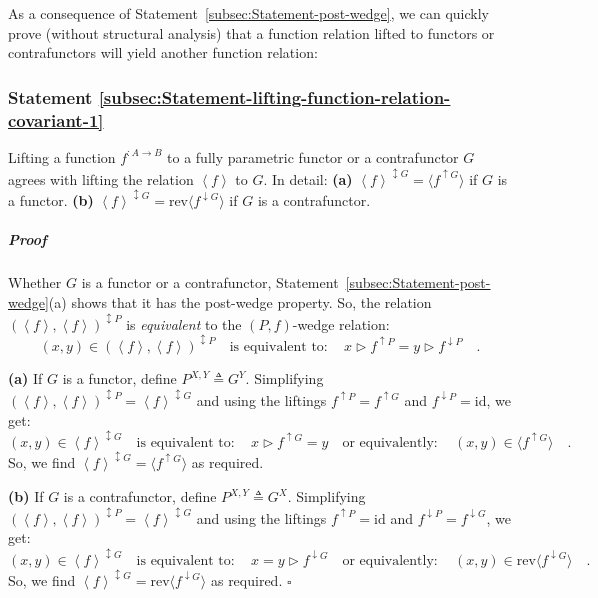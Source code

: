 As a consequence of Statement~\ref{subsec:Statement-post-wedge},
we can quickly prove (without structural analysis) that a function
relation lifted to functors or contrafunctors will yield another function
relation:

\subsubsection{Statement \label{subsec:Statement-lifting-function-relation-covariant-1}\ref{subsec:Statement-lifting-function-relation-covariant-1}}

Lifting a function $f^{:A\rightarrow B}$ to a fully parametric functor
or a contrafunctor $G$ agrees with lifting the relation $\left<f\right>$
to $G$. In detail: \textbf{(a)} $\left<f\right>^{\updownarrow G}=\langle f^{\uparrow G}\rangle$
if $G$ is a functor. \textbf{(b)} $\left<f\right>^{\updownarrow G}=\text{rev}\langle f^{\downarrow G}\rangle$
if $G$ is a contrafunctor.

\subparagraph{Proof}

Whether $G$ is a functor or a contrafunctor, Statement~\ref{subsec:Statement-post-wedge}(a)
shows that it has the post-wedge property. So, the relation $(\left<f\right>,\left<f\right>)^{\updownarrow P}$
is \emph{equivalent} to the $\left(P,f\right)$-wedge relation:
\[
(x,y)\in(\left<f\right>,\left<f\right>)^{\updownarrow P}\quad\text{is equivalent to}:\quad x\triangleright f^{\uparrow P}=y\triangleright f^{\downarrow P}\quad.
\]

\textbf{(a)} If $G$ is a functor, define $P^{X,Y}\triangleq G^{Y}$.
Simplifying $(\left<f\right>,\left<f\right>)^{\updownarrow P}=\left<f\right>^{\updownarrow G}$
and using the liftings $f^{\uparrow P}=f^{\uparrow G}$ and $f^{\downarrow P}=\text{id}$,
we get:
\[
(x,y)\in\left<f\right>^{\updownarrow G}\quad\text{is equivalent to}:\quad x\triangleright f^{\uparrow G}=y\quad\text{or equivalently}:\quad(x,y)\in\langle f^{\uparrow G}\rangle\quad.
\]
So, we find $\left<f\right>^{\updownarrow G}=\langle f^{\uparrow G}\rangle$
as required.

\textbf{(b)} If $G$ is a contrafunctor, define $P^{X,Y}\triangleq G^{X}$.
Simplifying $(\left<f\right>,\left<f\right>)^{\updownarrow P}=\left<f\right>^{\updownarrow G}$
and using the liftings $f^{\uparrow P}=\text{id}$ and $f^{\downarrow P}=f^{\downarrow G}$,
we get:
\[
(x,y)\in\left<f\right>^{\updownarrow G}\quad\text{is equivalent to}:\quad x=y\triangleright f^{\downarrow G}\quad\text{or equivalently}:\quad(x,y)\in\text{rev}\langle f^{\downarrow G}\rangle\quad.
\]
 So, we find $\left<f\right>^{\updownarrow G}=\text{rev}\langle f^{\downarrow G}\rangle$
as required. $\square$

